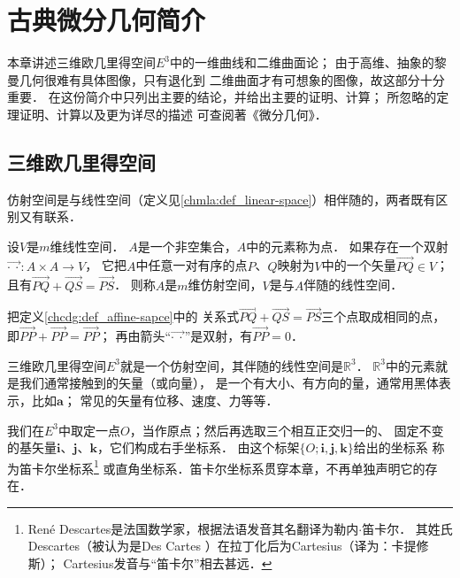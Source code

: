 
\chapter{古典微分几何简介} \label{chcdg}

本章讲述三维欧几里得空间$E^3$中的一维曲线和二维曲面论；
由于高维、抽象的黎曼几何很难有具体图像，只有退化到
二维曲面才有可想象的图像，故这部分十分重要．
在这份简介中只列出主要的结论，并给出主要的证明、计算；
所忽略的定理证明、计算以及更为详尽的描述
可查阅\textcite{subq-2016}著《微分几何》．



\section{三维欧几里得空间}\label{chcdg:sec_E3}
仿射空间是与线性空间（定义见\ref{chmla:def_linear-space}）相伴随的，两者既有区别又有联系．
\begin{definition}\label{chcdg:def_affine-sapce}
    设$V$是$m$维线性空间．
    $A$是一个非空集合，$A$中的元素称为{\heiti 点}．
    如果存在一个双射$\overrightarrow{\cdot \ \cdot} : A\times A \to V$，
    它把$A$中任意一对有序的点$P$、$Q$映射为$V$中的一个矢量$\overrightarrow{PQ}\in V$；
    且有$\overrightarrow{PQ}+\overrightarrow{QS}=\overrightarrow{PS}$．
    则称$A$是$m$维{\heiti 仿射空间}，$V$是与$A$伴随的线性空间．
\end{definition}


把定义\ref{chcdg:def_affine-sapce}中的
关系式$\overrightarrow{PQ}+\overrightarrow{QS}=\overrightarrow{PS}$三个点取成相同的点，
即$\overrightarrow{PP}+\overrightarrow{PP}=\overrightarrow{PP}$；
再由箭头“$\overrightarrow{\cdot\  \cdot}$”是双射，有$\overrightarrow{PP}=0$．




三维欧几里得空间$E^3$就是一个仿射空间，其伴随的线性空间是$\mathbb{R}^3$．
$\mathbb{R}^3$中的元素就是我们通常接触到的矢量（或向量），
是一个有大小、有方向的量，通常用黑体表示，比如$\boldsymbol{a}$；
常见的矢量有位移、速度、力等等．

我们在$E^3$中取定一点$O$，当作原点；然后再选取三个相互正交归一的、
固定不变的基矢量$\boldsymbol{i}$、$\boldsymbol{j}$、$\boldsymbol{k}$，它们构成右手坐标系．
由这个标架$\{O;\boldsymbol{i},\boldsymbol{j},\boldsymbol{k}\}$给出的坐标系
称为{\heiti 笛卡尔坐标系}{\footnote{        
Ren\'e Descartes是法国数学家，根据法语发音其名翻译为{\heiti 勒内$\cdot$笛卡尔}．
其姓氏Descartes（被认为是Des Cartes ）在拉丁化后为Cartesius（译为：卡提修斯）；
Cartesius发音与“笛卡尔”相去甚远．}}
或{\heiti 直角坐标系}．笛卡尔坐标系贯穿本章，不再单独声明它的存在．


